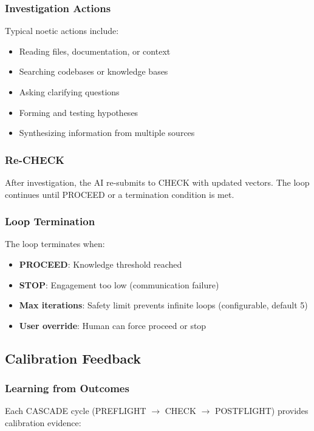 \subsubsection{Investigation Actions}

Typical noetic actions include:
\begin{itemize}
    \item Reading files, documentation, or context
    \item Searching codebases or knowledge bases
    \item Asking clarifying questions
    \item Forming and testing hypotheses
    \item Synthesizing information from multiple sources
\end{itemize}

\subsubsection{Re-CHECK}

After investigation, the AI re-submits to CHECK with updated vectors. The loop continues until PROCEED or a termination condition is met.

\subsubsection{Loop Termination}

The loop terminates when:
\begin{itemize}
    \item \textbf{PROCEED}: Knowledge threshold reached
    \item \textbf{STOP}: Engagement too low (communication failure)
    \item \textbf{Max iterations}: Safety limit prevents infinite loops (configurable, default 5)
    \item \textbf{User override}: Human can force proceed or stop
\end{itemize}

\subsection{Calibration Feedback}

\subsubsection{Learning from Outcomes}

Each CASCADE cycle (PREFLIGHT $\rightarrow$ CHECK $\rightarrow$ POSTFLIGHT) provides calibration evidence:

